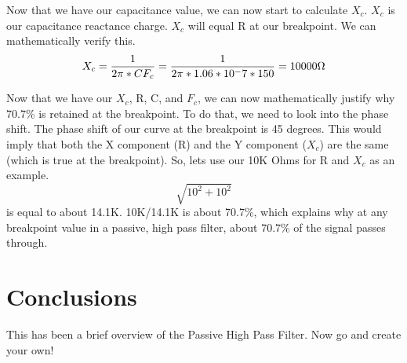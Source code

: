 \documentclass[letterpaper,12pt]{article}
\begin{document}
Now that we have our capacitance value, we can now start to calculate $X_c$. $X_c$ is our capacitance reactance charge. $X_c$ will equal R at our breakpoint. We can mathematically verify this.
\begin{equation}
    \setlength{\jot}{10pt}
    X_c = \frac{1}{2\pi*CF_c} \\
    = \frac{1}{2\pi*1.06*10^-7*150} \\
    =10000 \Omega
    \nonumber
\end{equation}

Now that we have our $X_c$, R, C, and $F_c$, we can now mathematically justify why 70.7\% is retained at the breakpoint. To do that, we need to look into the phase shift. The phase shift of our curve at the breakpoint is 45 degrees. This would imply that both the X component (R) and the Y component ($X_c$) are the same (which is true at the breakpoint). So, lets use our 10K Ohms for R and $X_c$ as an example. \[\sqrt{10^2+10^2}\] is equal to about 14.1K. 10K/14.1K is about 70.7\%, which explains why at any breakpoint value in a passive, high pass filter, about 70.7\% of the signal passes through.



\section{Conclusions}
This has been a brief overview of the Passive High Pass Filter. Now go and create your own!
\end{document}
